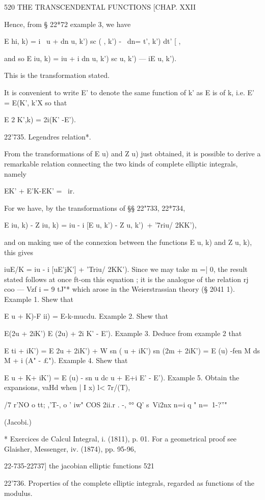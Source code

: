 520 THE TRANSCENDENTAL FUNCTIONS [CHAP. XXII

Hence, from § 22*72 example 3, we have

E hi, k) = i \ u + dn u, k') sc ( , k') - \ dn= t', k') dt' [ ,

and so E iu, k) = iu + i dn u, k') sc u, k') — iE u, k').

This is the transformation stated.

It is convenient to write E' to denote the same function of k' as E is
of k, i.e. E' = E(K', k'X so that

E 2 K',k) = 2i(K' -E').

22'735. Legendres relation*.

From the transformations of E u) and Z u) just obtained, it is
possible to derive a remarkable relation connecting the two kinds of
complete elliptic integrals, namely

EK' + E'K-EK' = \ ir.

For we have, by the transformations of §§ 22"733, 22*734,

E iu, k) - Z iu, k) = iu - i [E u, k') - Z u, k')\ + '7riu/ 2KK'),

and on making use of the connexion between the functions E u, k) and Z
u, k), this gives

iuE/K = iu - i [uE'jK'] + 'Triu/ 2KK'). Since we may take m =| 0, the
result stated follows at once ft-om this equation ; it is the analogue
of the relation rj coo — Vzf i = 9 tJ"* which arose in the
Weierstrassian theory (§ 2041 1). Example 1. Shew that

E u + K)-F ii) = E-k-mucdu. Example 2. Shew that

E(2u + 2iK') E (2u) + 2i K' - E'). Example 3. Deduce from example 2
that

E ti + iK') = E 2u + 2iK') + W sn ( u + iK') sn (2m + 2iK') = E (u)
-fen M ds M + i (A" - £"). Example 4. Shew that

E u + K+ iK') = E (u) - sn u dc u + E+i E' - E'). Example 5. Obtain
the expansions, vaHd when | I x) l< 7r/(T),

/7 r'NO o tt; ,'T-, o ' iw" COS 2ii.r . -, °° Q' s\ Vi2nx n=i q " n=\
1-?''"

(Jacobi.)

* Exercices de Calcul Integral, i. (1811), p. 01. For a geometrical
proof see Glaisher, Messenger, iv. (1874), pp. 95-96,

22-735-22737] the jacobian elliptic functions 521

22'736. Properties of the complete elliptic integrals, regarded as
functions of the modulus.

